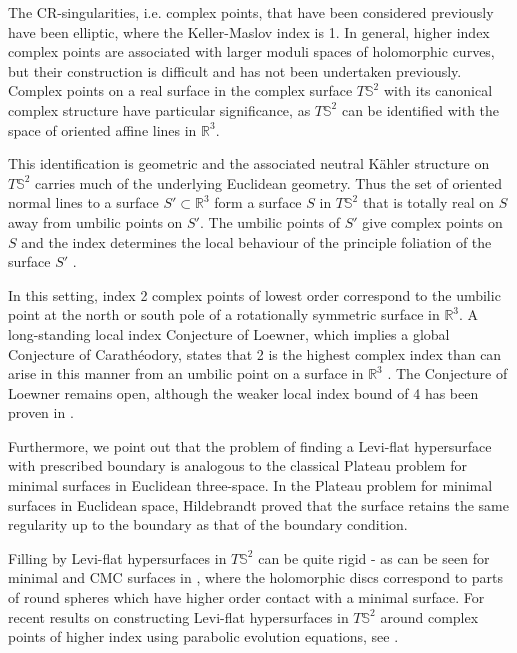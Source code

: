\documentclass{amsart}
\begin{document}
The CR-singularities, i.e. complex points, that have been considered previously have been elliptic, where the Keller-Maslov index is 1. In general, higher index complex points are associated with larger moduli spaces of holomorphic curves, but their construction is difficult and has not been undertaken previously. Complex points on a real surface in the complex surface $T{\mathbb S}^2$ with its canonical complex structure have particular significance, as $T{\mathbb S}^2$ can be identified with the space of oriented affine lines in ${\mathbb R}^3$. 

This identification is geometric and the associated neutral K\"ahler structure on $T{\mathbb S}^2$ carries much of the underlying Euclidean geometry. Thus the set of oriented normal lines to a surface $S'\subset{\mathbb R}^3$ form a surface $S$ in $T{\mathbb S}^2$ that is totally real on $S$ away from umbilic points on $S'$. The umbilic points of $S'$ give complex points on $S$ and the index determines the local behaviour of the principle foliation of the surface $S'$ \cite{GK05}.

In this setting, index 2 complex points of lowest order correspond to the umbilic point at the north or south pole of a rotationally symmetric surface in ${\mathbb R}^3$.  A long-standing local index Conjecture of Loewner, which implies a global Conjecture of Carath\'eodory, states that 2 is the highest complex index than can arise in this manner from an umbilic point on a surface in ${\mathbb R}^3$ \cite{GK19}\cite{GK20}\cite{GK24a}\cite{GK25}. The Conjecture of Loewner remains open, although the weaker local index bound of 4 has been proven in \cite{GK24c}.

Furthermore, we point out that the problem of finding a Levi-flat hypersurface with prescribed boundary is analogous to the classical Plateau problem for minimal surfaces in Euclidean three-space. In  the Plateau problem for minimal surfaces in Euclidean space, Hildebrandt \cite{Hi} proved that the surface retains the same regularity up to the boundary as that of the boundary condition.

Filling by Levi-flat hypersurfaces in $T{\mathbb S}^2$ can be quite rigid - as can be seen for minimal and CMC surfaces in \cite{MS23}, where the holomorphic discs correspond to parts of round spheres which have higher order contact with a minimal surface. For recent results on constructing Levi-flat hypersurfaces in $T{\mathbb S}^2$ around complex points of higher index using parabolic evolution equations, see \cite{GK24b}.  
\end{document}
